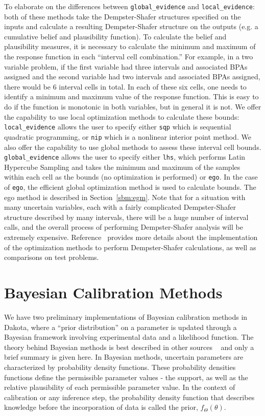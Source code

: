 To elaborate on the differences between \texttt{global\_evidence}
and \texttt{local\_evidence}: both of these methods
take the Dempster-Shafer structures specified on the inputs 
and calculate a resulting Dempster-Shafer structure on the 
outputs (e.g. a cumulative belief and plausibility function). 
To calculate the belief and plausibility measures, it is 
necessary to calculate the minimum and maximum of the response function 
in each ``interval cell combination.''  For example, in a two variable 
problem, if the first variable had three intervals and associated BPAs 
assigned and the second variable had two intervals and associated 
BPAs assigned, there would be 6 interval cells in total. 
In each of these six cells, one needs to identify a minimum and 
maximum value of the response function. This is easy to do if 
the function is monotonic in both variables, but in general 
it is not. We offer the capability to use local optimization 
methods to calculate these bounds: \texttt{local\_evidence}
allows the user to specify either \texttt{sqp} which is sequential 
quadratic programming, or \texttt{nip} which is a nonlinear interior point 
method. We also offer the capability to use global methods to 
assess these interval cell bounds. \texttt{global\_evidence}
allows the user to specify either \texttt{lhs}, which performs 
Latin Hypercube Sampling and takes the minimum and maximum of 
the samples within each cell as the bounds (no optimization is 
performed) or \texttt{ego}. In the case of \texttt{ego}, 
the efficient global optimization method is used to calculate 
bounds. The ego method is described in Section~\ref{sbm:egm}.
Note that for a situation with many uncertain variables, 
each with a fairly complicated Dempster-Shafer structure 
described by many intervals, there will be a huge number 
of interval calls, and the overall process of performing 
Dempster-Shafer analysis will be extremely expensive. 
Reference~\cite{Tang10b} provides more details about 
the implementation of the optimization methods to perform 
Dempster-Shafer calculations, as well as comparisons on test problems.

\section{Bayesian Calibration Methods}\label{uq:bayesian}
We have two preliminary implementations of Bayesian calibration methods 
in Dakota, where a ``prior distribution'' on a parameter is 
updated through a Bayesian framework involving experimental data and 
a likelihood function. 
The theory behind Bayesian methods is best described in other sources 
~\cite{Kenn01} and only a brief summary is given here. 
In Bayesian methods, uncertain parameters are characterized by probability 
density functions. These probability densities functions define the 
permissible parameter values - the support, as well as the relative
 plausibility of each permissible parameter value. In the context of 
calibration or any inference step, the probability density function 
that describes knowledge before the incorporation of data is called 
the prior, $f_\Theta\left( \theta  \right)$.
 
